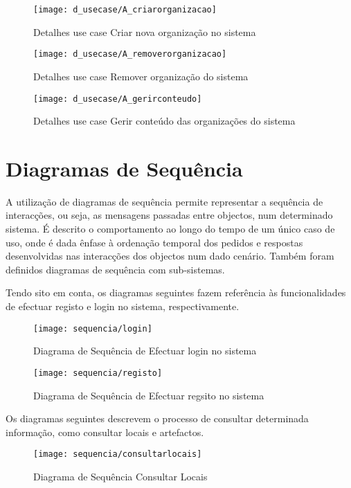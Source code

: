 \documentclass[12pt,a4paper]{article}
\begin{document}
\begin{figure}[h!]
\centering
\texttt{[image: d\_usecase/A\_criarorganizacao]}
\label{usecase}
\caption{Detalhes use case Criar nova organização no sistema}
\end{figure}

\begin{figure}[h!]
\centering
\texttt{[image: d\_usecase/A\_removerorganizacao]}
\label{usecase}
\caption{Detalhes use case Remover organização do sistema}
\end{figure}

\begin{figure}[h!]
\centering
\texttt{[image: d\_usecase/A\_gerirconteudo]}
\label{usecase}
\caption{Detalhes use case Gerir conteúdo das organizações do sistema} 
\end{figure}


\clearpage
\section{Diagramas de Sequência}
A utilização de diagramas de sequência permite representar a sequência de interacções, ou
seja, as mensagens passadas entre objectos, num determinado sistema. É descrito o comportamento
ao longo do tempo de um único caso de uso, onde é dada ênfase à ordenação temporal dos pedidos e respostas desenvolvidas nas interacções dos objectos num dado cenário. Também foram definidos diagramas de sequência com sub-sistemas.

Tendo sito em conta, os diagramas seguintes fazem referência às funcionalidades de efectuar registo e login no sistema, respectivamente.\\

\begin{figure}[h!]
\centering
\texttt{[image: sequencia/login]}
\caption{Diagrama de Sequência de Efectuar login no sistema} 
\end{figure}

\begin{figure}[h!]
\centering
\texttt{[image: sequencia/registo]}
\caption{Diagrama de Sequência de Efectuar regsito no sistema} 
\end{figure}

\clearpage

Os diagramas seguintes descrevem o processo de consultar determinada informação, como consultar locais e artefactos.\\

\begin{figure}[h!]
\centering
\texttt{[image: sequencia/consultarlocais]}
\caption{Diagrama de Sequência Consultar Locais} 
\end{figure}
\end{document}
